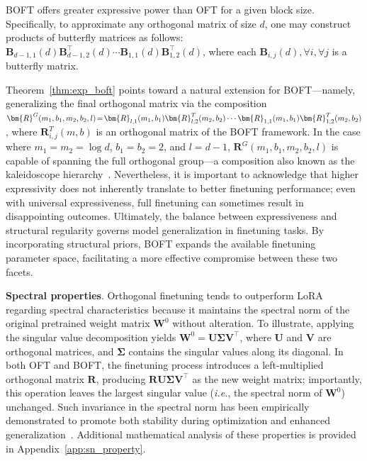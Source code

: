 \begin{theorem}\label{thm:exp_boft}
    BOFT offers greater expressive power than OFT for a given block size. Specifically, to approximate any orthogonal matrix of size $d$, one may construct products of butterfly matrices as follows: $\bm{B}_{d-1,1}(d)\bm{B}^\top_{d-1,2}(d)\cdots\bm{B}_{1,1}(d)\bm{B}^\top_{1,2}(d)$, where each $\bm{B}_{i,j}(d),\forall i,\forall j$ is a butterfly matrix.
\end{theorem}

Theorem~\ref{thm:exp_boft} points toward a natural extension for BOFT—namely, generalizing the final orthogonal matrix via the composition $\thickmuskip=2mu \medmuskip=2mu \bm{R}^G(m_1,b_1,m_2,b_2,l)=\bm{R}_{l,1}(m_1,b_1)\bm{R}_{l,2}^T(m_2,b_2)\cdots\bm{R}_{1,1}(m_1,b_1)\bm{R}_{1,2}^T(m_2,b_2)$, where $\bm{R}_{i,j}^T(m,b)$ is an orthogonal matrix of the BOFT framework. In the case where $m_1=m_2=\log d$, $b_1=b_2=2$, and $l=d-1$, $\bm{R}^G(m_1,b_1,m_2,b_2,l)$ is capable of spanning the full orthogonal group—a composition also known as the kaleidoscope hierarchy~\cite{dao2019kaleidoscope}. Nevertheless, it is important to acknowledge that higher expressivity does not inherently translate to better finetuning performance; even with universal expressiveness, full finetuning can sometimes result in disappointing outcomes. Ultimately, the balance between expressiveness and structural regularity governs model generalization in finetuning tasks. By incorporating structural priors, BOFT expands the available finetuning parameter space, facilitating a more effective compromise between these two facets.

\textbf{Spectral properties}. Orthogonal finetuning tends to outperform LoRA regarding spectral characteristics because it maintains the spectral norm of the original pretrained weight matrix $\bm{W}^0$ without alteration. To illustrate, applying the singular value decomposition yields $\bm{W}^0 = \bm{U}\bm{\Sigma}\bm{V}^\top$, where $\bm{U}$ and $\bm{V}$ are orthogonal matrices, and $\bm{\Sigma}$ contains the singular values along its diagonal. In both OFT and BOFT, the finetuning process introduces a left-multiplied orthogonal matrix $\bm{R}$, producing $\bm{R}\bm{U}\bm{\Sigma}\bm{V}^\top$ as the new weight matrix; importantly, this operation leaves the largest singular value (\emph{i.e.}, the spectral norm of $\bm{W}^0$) unchanged. Such invariance in the spectral norm has been empirically demonstrated to promote both stability during optimization and enhanced generalization~\cite{miyato2018spectral, yoshida2017spectral}. Additional mathematical analysis of these properties is provided in Appendix~\ref{app:sn_property}.

